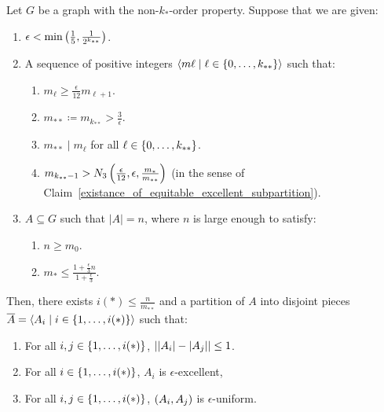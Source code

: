     \lemma[Corollary 5.15]\label{resume_of_all_conditions_for_excellent_partitions}
        Let $G$ be a graph with the non-$k_{*}$-order property.
        Suppose that we are given:
        \begin{enumerate}
            \item $\epsilon < \min \left( \frac{1}{5}, \frac{1}{2^{k_{**}}} \right)$.
            \item A sequence of positive integers $\left< m\ell \mid \ell \in \left\{ 0, \dots, k_{**} \right\} \right>$ such that:
            \begin{enumerate}[label=(\alph*), ref=2.\alph*]
                \item \label{itm:5.15.a} $m_\ell \geq \frac{\epsilon}{12} m_{\ell + 1}$.
                \item \label{itm:5.15.b} $m_{**} \coloneq m_{k_{**}} > \frac{3}{\epsilon}$.
                \item \label{itm:5.15.c} $m_{**} \mid m_\ell$ for all $\ell \in \left\{ 0, \dots, k_{**} \right\}$.
                \item \label{itm:5.15.d} $m_{k_{**}-1} > N_3\left( \frac{\epsilon}{12}, \epsilon, \frac{m_*}{m_{**}} \right)$ (in the sense
                    of Claim~\ref{existance_of_equitable_excellent_subpartition}).
            \end{enumerate}
            \item $A \subseteq G$ such that $|A| = n$, where $n$ is large enough to satisfy:
            \begin{enumerate}[label=(\alph*'), ref=3.\alph*]
                \item \label{itm:5.15.a'} $n \geq m_0$. 
                \item \label{itm:5.15.b'} $m_* \leq \frac{1 + \frac{\epsilon}{3}n}{1 + \frac{\epsilon}{3}}$.
            \end{enumerate}
        \end{enumerate}
        Then, there exists $i(*) \leq \frac{n}{m_{**}}$ and a partition of $A$ into disjoint pieces
        $\overline{A} = \left< A_i \mid i \in \left\{ 1, \dots, i(*) \right\} \right>$ such that:
        \begin{enumerate}[label=(\roman*), ref=\roman*]
            \item \label{itm:5.15.i} For all $i, j \in \left\{ 1, \dots, i(*) \right\}$, $\left| \left| A_i \right|- \left| A_j \right| \right| \leq 1$.
            \item \label{itm:5.15.ii} For all $i \in \left\{ 1, \dots, i(*) \right\}$, $A_i$ is $\epsilon$-excellent,
            \item \label{itm:5.15.iii} For all $i, j \in \left\{ 1, \dots, i(*) \right\}$, $\left( A_i, A_j \right)$ is $\epsilon$-uniform.
        \end{enumerate}
